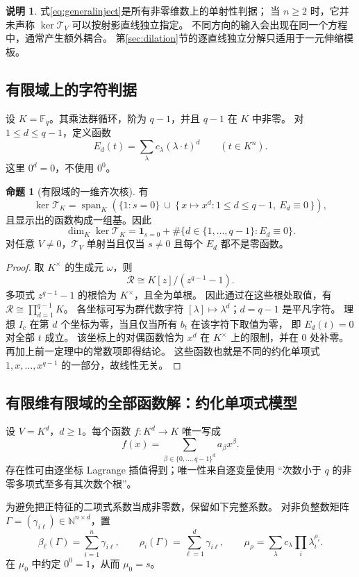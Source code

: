 \documentclass[UTF8,11pt,a4paper]{ctexart}
\theoremstyle{definition}
\newtheorem{proposition}[theorem]{命题}
\newtheorem{remark}[theorem]{说明}
\newcommand{\N}{\mathbb N}
\newcommand{\Span}{\operatorname{span}}
\newcommand{\T}{\mathcal T}
\numberwithin{equation}{section}
\begin{document}
\begin{remark}
式\eqref{eq:generalinject}是所有非零维数上的单射性判据；
当 $n\ge2$ 时，它并未声称 $\ker\T_V$ 可以按射影直线独立指定。
不同方向的输入会出现在同一个方程中，通常产生额外耦合。
第\ref{sec:dilation}节的逐直线独立分解只适用于一元伸缩模板。
\end{remark}

\subsection{有限域上的字符判据}
设 $K=\mathbb F_q$。其乘法群循环，阶为 $q-1$，并且 $q-1$ 在 $K$ 中非零。
对 $1\le d\le q-1$，定义函数
\[
 E_d(t)=\sum_\lambda c_\lambda(\lambda\cdot t)^d
 \qquad(t\in K^n).
\]
这里 $0^d=0$，不使用 $0^0$。

\begin{proposition}[有限域的一维齐次核]\label{prop:finitechars}
有
\[
 \ker\T_K
 =
 \Span_K\!\left(
 \{1:s=0\}\ \cup\
 \{\,x\mapsto x^d:1\le d\le q-1,\ E_d\equiv0\,\}
 \right),
\]
且显示出的函数构成一组基。因此
\[
 \dim_K\ker\T_K=\mathbf1_{s=0}
 +\#\{d\in\{1,\ldots,q-1\}:E_d\equiv0\}.
\]
对任意 $V\ne0$，$\T_V$ 单射当且仅当 $s\ne0$ 且每个 $E_d$ 都不是零函数。
\end{proposition}
\begin{proof}
取 $K^\times$ 的生成元 $\omega$，则
\[
 \mathscr R\cong K[z]/(z^{q-1}-1).
\]
多项式 $z^{q-1}-1$ 的根恰为 $K^\times$，且全为单根。
因此通过在这些根处取值，有
$\mathscr R\cong\prod_{d=1}^{q-1}K$。
各坐标可写为群代数字符
$[\lambda]\mapsto\lambda^d$；$d=q-1$ 是平凡字符。
理想 $I_c$ 在第 $d$ 个坐标为零，当且仅当所有 $b_t$ 在该字符下取值为零，
即 $E_d(t)=0$ 对全部 $t$ 成立。
该坐标上的对偶函数恰为 $x^d$ 在 $K^\times$ 上的限制，并在 $0$ 处补零。
再加上前一定理中的常数项即得结论。
这些函数也就是不同的约化单项式 $1,x,\ldots,x^{q-1}$ 的一部分，故线性无关。
\end{proof}

\subsection{有限维有限域的全部函数解：约化单项式模型}
设 $V=K^d$，$d\ge1$。每个函数 $f:K^d\to K$ 唯一写成
\[
 f(x)=\sum_{\beta\in\{0,\ldots,q-1\}^d}a_\beta x^\beta.
\]
存在性可由逐坐标 Lagrange 插值得到；唯一性来自逐变量使用
“次数小于 $q$ 的非零多项式至多有其次数个根”。

为避免把正特征的二项式系数当成非零数，保留如下完整系数。
对非负整数矩阵 $\Gamma=(\gamma_{i\ell})\in\N^{n\times d}$，置
\[
 \beta_\ell(\Gamma)=\sum_{i=1}^n\gamma_{i\ell},\qquad
 \rho_i(\Gamma)=\sum_{\ell=1}^d\gamma_{i\ell},\qquad
 \mu_\rho=\sum_\lambda c_\lambda\prod_i\lambda_i^{\rho_i}.
\]
在 $\mu_0$ 中约定 $0^0=1$，从而 $\mu_0=s$。
\end{document}

